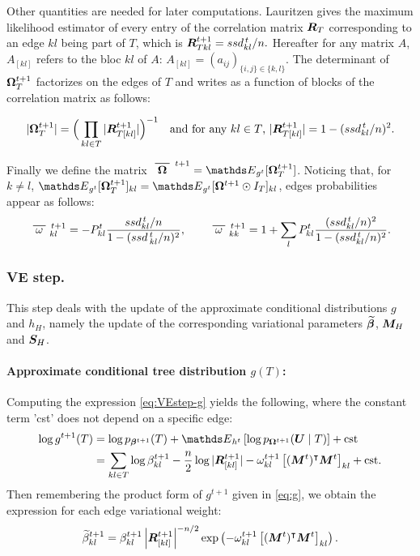 Other quantities are needed for later computations. Lauritzen  gives the maximum likelihood estimator of every entry of the correlation matrix ${\boldsymbol{R}}_T$ corresponding to an edge $kl$ being part of $T$, which is
$ {\boldsymbol{R}}_{Tkl}^{t+1} = ssd_{kl}^{\,t}/n. $
Hereafter for any matrix $A$, $A_{[kl]}$ refers to the bloc $kl$ of $A$: $A_{[kl]}=(a_{ij})_{\{i,j\}\in\{k,l\}}$. The determinant of ${\boldsymbol{\Omega}}^{t+1}_T$ factorizes on the edges of $T$ and writes as a function of blocks of the correlation matrix  as follows:  

\begin{align}
    |{\boldsymbol{\Omega}}^{t+1}_{T}| = \Big(\prod_{kl \in T} |{\boldsymbol{R}}_{T[kl]}^{t+1}|\Big)^{-1}
\quad 
\text{and for any $kl \in T$, } 
|{\boldsymbol{R}}_{T[kl]}^{t+1}|= 1-(ssd_{kl}^{\,t}/n)^2. \label{RT}
\end{align}

 
Finally we define the matrix  $\xbar{\Omegabf}^{\,t+1} = \Esp_{g^t}[\Omegabf^{t+1}_T]$. 
Noticing that, for $k \neq l$, $\Esp_{g^t}[\Omegabf^{t+1}_T]_{kl} = \Esp_{g^t}[\Omegabf^{t+1} \odot I_T]_{kl}$, edges probabilities appear as follows:
$$
\xbar{\omega}_{kl}^{\,t+1} 
= - P_{kl}^t\dfrac{ ssd_{kl}^{\,t}/n}{1-(ssd\,^t_{kl}/n)^2}, 
\qquad 
\xbar{\omega}_{kk}^{\,t+1}= 1+\sum_l P_{kl}^t \dfrac{(ssd_{kl}^{\,t}/n)^2}{1-(ssd_{kl}^{\,t}/n)^2}.
$$

 
\subsubsection*{VE step.} 
This step deals with the update of the approximate conditional distributions $g$ and $h_H$, namely the update of the corresponding variational parameters ${\widetilde{{\boldsymbol{\beta}}}}$, ${\boldsymbol{M}}_H$ and ${\boldsymbol{S}}_H$.

\paragraph{Approximate conditional tree distribution $g(T)$:}
Computing the expression \eqref{eq:VEstep-g} yields the following, where the constant term 'cst' does not depend on a specific edge:
\begin{align*}
 \log g^{t+1}(T) &= \log p_{\betabf^{t+1}}(T) + \Esp_{h^t} \left[ \log p_{\Omegabf^{t+1}}(\Ubf \mid T) \right]  + \text{cst}  \\
&=  \sum_{kl \in T} \log \beta^{t+1}_{kl} 
- \frac{n}2 \log |\Rbf_{[kl]}^{t+1} | 
-  \omega^{t+1}_{kl} \left[(\Mbf^t)^\intercal \Mbf^t\right]_{kl} + \text{cst}.
\end{align*}
  Then remembering the product form of  $g^{t+1}$ given in \eqref{eq:g}, we obtain the expression for each edge variational weight:
  \begin{equation}\label{update:beta}
      {\widetilde{\beta}}^{t+1}_{kl} = \beta^{t+1}_{kl} \left|{\boldsymbol{R}}_{[kl]}^{t+1}\right|^{-n/2} \exp\left(-\omega^{t+1}_{kl} \left[({\boldsymbol{M}}^t)^\intercal {\boldsymbol{M}}^t\right]_{kl}\right).
  \end{equation}
 

